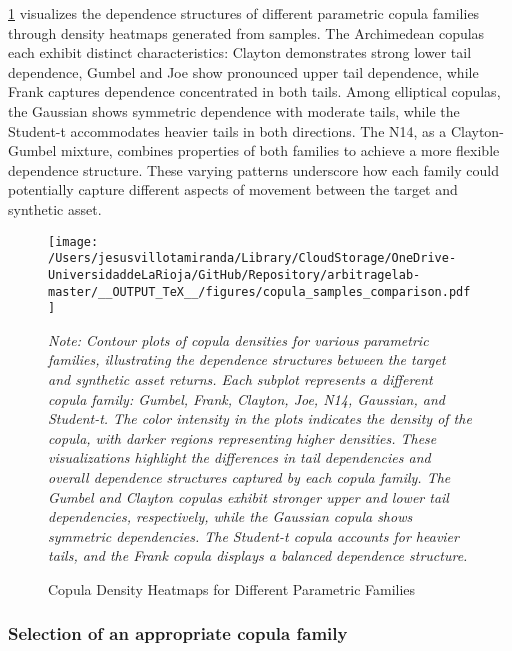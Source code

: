 \cref{fig:copula_samples_comparison} visualizes the dependence structures of different parametric copula families through density heatmaps generated from samples. The Archimedean copulas each exhibit distinct characteristics: Clayton demonstrates strong lower tail dependence, Gumbel and Joe show pronounced upper tail dependence, while Frank captures dependence concentrated in both tails. Among elliptical copulas, the Gaussian shows symmetric dependence with moderate tails, while the Student-t accommodates heavier tails in both directions. The N14, as a Clayton-Gumbel mixture, combines properties of both families to achieve a more flexible dependence structure. These varying patterns underscore how each family could potentially capture different aspects of movement between the target and synthetic asset.

\begin{figure}[H]
  \caption{Copula Density Heatmaps for Different Parametric Families}
  \centering
  \texttt{[image: /Users/jesusvillotamiranda/Library/CloudStorage/OneDrive-UniversidaddeLaRioja/GitHub/Repository/arbitragelab-master/\_\_OUTPUT\_TeX\_\_/figures/copula\_samples\_comparison.pdf]}
  \label{fig:copula_samples_comparison}
\vspace{0.5cm}
\begin{minipage}{\textwidth}
\setlength{\parindent}{0pt}
\small\textit{Note: 
Contour plots of copula densities for various parametric families, illustrating the dependence structures between the target and synthetic asset returns. Each subplot represents a different copula family: Gumbel, Frank, Clayton, Joe, N14, Gaussian, and Student-t. The color intensity in the plots indicates the density of the copula, with darker regions representing higher densities. These visualizations highlight the differences in tail dependencies and overall dependence structures captured by each copula family. The Gumbel and Clayton copulas exhibit stronger upper and lower tail dependencies, respectively, while the Gaussian copula shows symmetric dependencies. The Student-t copula accounts for heavier tails, and the Frank copula displays a balanced dependence structure. 
}
\end{minipage}

\end{figure}

\subsubsection{Selection of an appropriate copula family}

